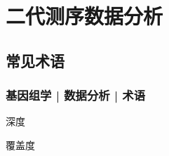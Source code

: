 \section{二代测序数据分析}
\subsection{常见术语}
\begin{frame}[label=current]
  \frametitle{基因组学 | 数据分析 | 术语}
  \begin{block}{深度}
  \end{block}
  \pause
  \begin{block}{覆盖度}
  \end{block}
\end{frame}
